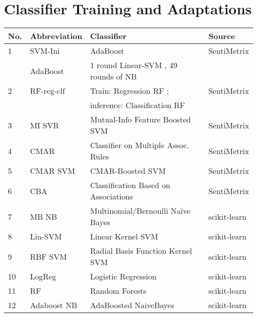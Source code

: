 \chapter{Classifier Training and Adaptations}\label{sec:ml}


\begin{table}[t]
{\small
    \centering
    \begin{tabular}{|l|l|l|l|}
    \hline
    \textsf{No.}& \textsf{Abbreviation} & \textsf{Classifier} & \textsf{Source}\\
    \hline
    1 & \textsf{SVM-Ini}& \textsf{AdaBoost \cite{adaboost} \cite{scikit-learn}} & \textsf{SentiMetrix} \\
      & \textsf{AdaBoost} & \textsf{1 round Linear-SVM \cite{cortes95}},  49 rounds of NB  & \\
    2 & \textsf{RF-reg-clf} & \textsf{Train: Regression RF \cite{ho95}}; & \textsf{SentiMetrix} \\
      & & \textsf{inference: Classification RF} & \\
    3 &\textsf{MI SVR}&  \textsf{Mutual-Info \cite{ross14} Feature Boosted SVM \cite{cortes95}} & \textsf{SentiMetrix} \\
    4 & \textsf{CMAR} &  \textsf{Classifier on Multiple Assoc. Rules \cite{cmar}}& \textsf{SentiMetrix} \\
    5 & \textsf{CMAR SVM}& \textsf{CMAR-Boosted \cite{cmar} SVM \cite{cortes95}}& \textsf{SentiMetrix} \\
    6 & \textsf{CBA} & \textsf{Classification Based on Associations \cite{cba}}& \textsf{SentiMetrix} \\
    \hline
    7 & \textsf{MB NB} & \textsf{Multinomial/Bernoulli Na\"{i}ve Bayes \cite{scikit-learn}} & \textsf{scikit-learn} \\
    8 & \textsf{Lin-SVM}& \textsf{Linear Kernel SVM \cite{cortes95}} & \textsf{scikit-learn} \\
    9 & \textsf{RBF SVM}& \textsf{Radial Basis Function Kernel SVM \cite{scikit-learn}} & \textsf{scikit-learn} \\
    10 & \textsf{LogReg} & \textsf{Logistic Regression \cite{scikit-learn}} & \textsf{scikit-learn}\\
    11 & \textsf{RF} & \textsf{Random Forests \cite{ho95}} & \textsf{scikit-learn} \\
    12 &  \textsf{Adaboost NB}& \textsf{AdaBoosted NaiveBayes \cite{adaboost}}& \textsf{scikit-learn} \\

\end{tabular}}
\end{table}

